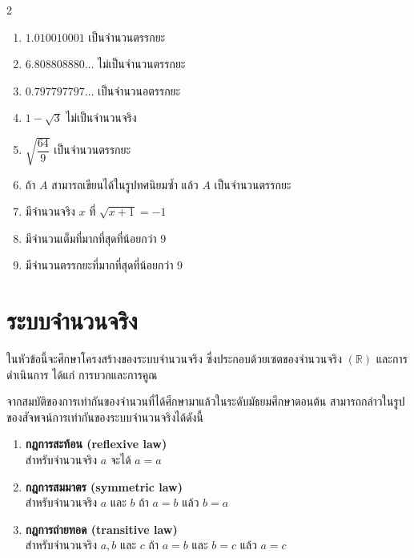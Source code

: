 \begin{enumerate}[label=\arabic*., leftmargin=*, itemsep=1em]
\begin{multicols}{2}
\begin{enumerate}[label=\theenumi\arabic*), leftmargin=2em, itemsep=0.6em]
		\item $1.010010001$ เป็นจำนวนตรรกยะ
		
		\item $6.808808880 \ldots$ ไม่เป็นจำนวนตรรกยะ
		
		\item $0.797797797 \ldots$ เป็นจำนวนอตรรกยะ
		
		\item $1-\sqrt{3}$ ไม่เป็นจำนวนจริง
		
		\item $\sqrt{\dfrac{64}{9}}$ เป็นจำนวนตรรกยะ
		
		\item ถ้า $A$ สามารถเขียนได้ในรูปทศนิยมซ้ำ แล้ว $A$ เป็นจำนวนตรรกยะ
		
		\item มีจำนวนจริง $x$ ที่ $\sqrt{x+1}=-1$
		
		\item มีจำนวนเต็มที่มากที่สุดที่น้อยกว่า $9$
		
		\item มีจำนวนตรรกยะที่มากที่สุดที่น้อยกว่า $9$
		
	\end{enumerate}
\end{multicols}
\end{enumerate}

\newpage
\section{ระบบจำนวนจริง}

ในหัวข้อนี้จะศึกษาโครงสร้างของระบบจำนวนจริง ซึ่งประกอบด้วยเซตของจำนวนจริง $(\mathbb{R})$ และการดำเนินการ ได้แก่ การบวกและการคูณ

จากสมบัติของการเท่ากันของจำนวนที่ได้ศึกษามาแล้วในระดับมัธยมศึกษาตอนต้น สามารถกล่าวในรูปของสัจพจน์การเท่ากันของระบบจำนวนจริงได้ดังนี้
\begin{enumerate}[label=\arabic*., leftmargin=2em, itemsep=0.4em]
	\item \textbf{กฎการสะท้อน (reflexive law)} \\
	สำหรับจำนวนจริง $a$ จะได้ $a = a$
	
	\item \textbf{กฎการสมมาตร (symmetric law)} \\
	สำหรับจำนวนจริง $a$ และ $b$ ถ้า $a = b$ แล้ว $b = a$
	
	\item \textbf{กฎการถ่ายทอด (transitive law)} \\
	สำหรับจำนวนจริง $a, b$ และ $c$ ถ้า $a = b$ และ $b = c$ แล้ว $a = c$
\end{enumerate}

